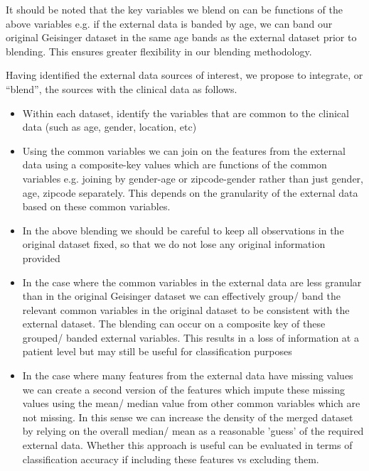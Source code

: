 \documentclass{article}
\begin{document}
\noindent It should be noted that the key variables we blend on can be functions 
of the above variables e.g. if the external data is banded by age, we can band 
our original Geisinger dataset in the same age bands as the external dataset prior 
to blending. This ensures greater flexibility in our blending methodology.

\noindent Having identified the external data sources of interest, we propose 
to integrate, or “blend”, the sources with the clinical data as follows.

\begin{itemize}
  \item  Within each dataset, identify the variables that are common to the 
         clinical data (such as age, gender, location, etc)
  \item  Using the common variables we can join on the features from the 
         external data using a composite-key values which are functions of the 
         common variables e.g. joining by gender-age or zipcode-gender 
         rather than just gender, age, zipcode separately. This depends on the 
         granularity of the external data based on these common variables.
  \item  In the above blending we should be careful to keep all observations in
         the original dataset fixed, so that we do not lose any original 
         information provided
  \item  In the case where the common variables in the external data are less 
         granular than in the original Geisinger dataset we can effectively group/ band 
         the relevant common variables in the original dataset to be consistent
         with the external dataset. The blending can occur on a composite key of 
         these grouped/ banded external variables. This results in a loss of 
         information at a patient level but may still be useful for classification
         purposes
  \item  In the case where many features from the external data have missing values
         we can create a second version of the features which impute these missing 
         values using the mean/ median value from other common variables which 
         are not missing. In this sense we can increase the density of the merged 
         dataset by relying on the overall median/ mean as a reasonable 'guess'
         of the required external data. Whether this approach is useful can be
         evaluated in terms of classification accuracy if including these features 
         vs excluding them.
\end{itemize}
\end{document}
